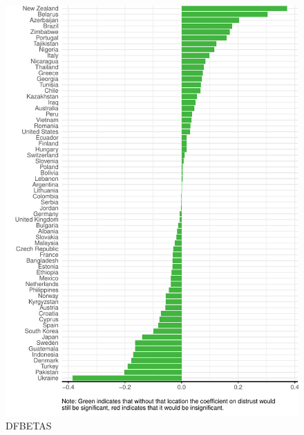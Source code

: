 \documentclass[
  12pt,
]{article}
\begin{document}
\begin{figure}
\includegraphics[width=0.8\linewidth]{write_up_test_files/figure-latex/dfbetas-1} \caption{DFBETAS}\label{fig:dfbetas}
\end{figure}
\end{document}
